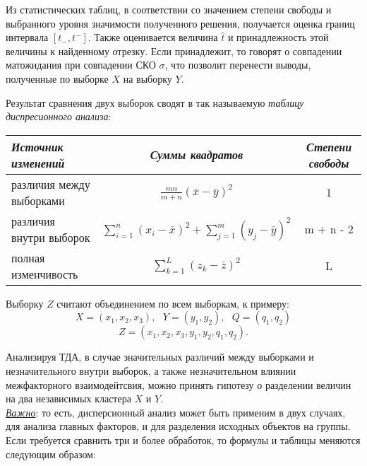 \documentclass[12pt]{article}
\begin{document}
Из статистических таблиц, в соответствии со значением степени свободы и выбранного уровня значимости полученного решения, получается оценка границ интервала $[t_{-}, t^{-}]$. Также оценивается величина $\hat{t}$ и принадлежность этой величины к найденному отрезку. Если принадлежит, то говорят о совпадении матожидания при совпадении СКО $\sigma$, что позволит перенести выводы, полученные по выборке $X$ на выборку $Y$.

\newpage
Результат сравнения двух выборок сводят в так называемую \emph{таблицу диспресионного анализа}:

\begin{center}
\bgroup
\def\arraystretch{2.5}
\begin{tabular}{|l|c|c|}
        \hline
	    \textit{Источник изменений} & \textit{Суммы квадратов} & \textit{Степени свободы}\\
        \hline
	    различия между выборками & $\frac{mn}{m+n} ( \bar{x} - \bar{y})^2$ & 1\\
	    различия внутри выборок & $\sum\limits_{i=1}^n (x_i - \bar{x})^2 + \sum\limits_{j=1}^m (y_j - \bar{y})^2$ & m + n - 2\\
	    полная изменчивость & $\sum\limits_{k=1}^L (z_k - \bar{z})^2$ & L\\
        \hline
\end{tabular}
\egroup
\end{center}

Выборку $Z$ считают объединением по всем выборкам, к примеру:
\[ X = (x_1, x_2, x_3), ~~~ Y = (y_1, y_2), ~~~ Q = (q_1, q_2)\]
\[ Z = (x_1, x_2, x_3, y_1, y_2, q_1, q_2). \]

Анализируя ТДА, в случае значительных различий между выборками и незначительного внутри выборок, а также незначительном влиянии межфакторного взаимодейтсвия, можно принять гипотезу о разделении величин на два независимых кластера $X$ и $Y$.\\

\underline{\emph{Важно}}: то есть, дисперсионный анализ может быть применим в двух случаях, для анализа главных факторов, и для разделения исходных объектов на группы.\\

Если требуется сравнить три и более обработок, то формулы и таблицы меняются следующим образом:
\end{document}
